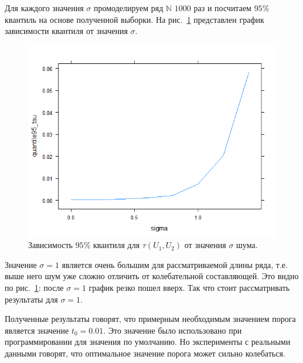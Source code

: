 \documentclass[specialist,
               substylefile = spbu.rtx,
               subf,href,colorlinks=true, 12pt]{disser}
\begin{document}
Для каждого значения $\sigma$ промоделируем ряд $\mathbb{N}$ $1000$ раз и посчитаем $95\%$ квантиль на основе полученной выборки. На рис.~\ref{fig:q95_tau1} представлен график зависимости квантиля от значения $\sigma$.
\begin{figure}[!hhh]
	\begin{center}
	\includegraphics[width = 4.5in]{q95_tau1}
	\end{center}
	\caption{Зависимость $95\%$ квантиля для $\tau(U_1, U_2)$ от значения $\sigma$ шума.}
	\label{fig:q95_tau1}
\end{figure}

Значение $\sigma = 1$ является очень большим для рассматриваемой длины ряда, т.е. выше него шум уже сложно отличить от колебательной составляющей. Это видно по рис.~\ref{fig:q95_tau1}: после $\sigma=1$ график резко пошел вверх. Так что стоит рассматривать результаты для $\sigma=1$.

Полученные результаты говорят, что примерным необходимым значением порога является значение $t_0 = 0.01$.
Это значение было использовано при программировании для значения по умолчанию. Но эксперименты с реальными данными говорят, что оптимальное значение порога может сильно колебаться.
\end{document}
